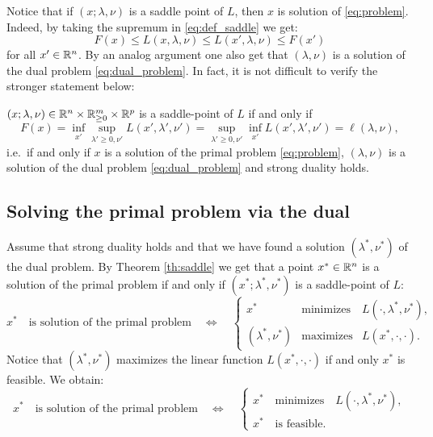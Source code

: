 \documentclass[11pt,nocut]{article}
\begin{document}
Notice that if $(x; \lambda,\nu)$ is a saddle point of $L$, then $x$ is solution of \eqref{eq:problem}. Indeed, by taking the supremum in \eqref{eq:def_saddle} we get:
$$
F(x) \leq L(x,\lambda,\nu) \leq L(x',\lambda,\nu) \leq F(x')
$$
for all $x' \in \mathbb{R}^n$. By an analog argument one also get that $(\lambda,\nu)$ is a solution of the dual problem \eqref{eq:dual_problem}.
In fact, it is not difficult to verify the stronger statement below:

\begin{theorem}\label{th:saddle}
	$(x; \lambda,\nu) \in \mathbb{R}^n \times \mathbb{R}_{\geq 0}^m \times \mathbb{R}^p$ is a saddle-point of $L$ if and only if
	\begin{equation}\label{eq:th_saddle}
	F(x)
	= 
	\inf_{x'}\sup_{\lambda' \geq 0, \nu'} L(x',\lambda',\nu')
	=
	\sup_{\lambda' \geq 0, \nu'}
	\inf_{x'}
	L(x',\lambda',\nu') 
	= \ell(\lambda,\nu),
	\end{equation}
	i.e.\ if and only if $x$ is a solution of the primal problem \eqref{eq:problem}, $(\lambda,\nu)$ is a solution of the dual problem \eqref{eq:dual_problem} and strong duality holds.
\end{theorem}

\subsection{Solving the primal problem via the dual}

Assume that strong duality holds and that we have found a solution $(\lambda^*,\nu^*)$ of the dual problem. 
By Theorem \ref{th:saddle} we get that a point $x^* \in \mathbb{R}^n$ is a solution of the primal problem if and only if $(x^*;\lambda^*,\nu^*)$ is a saddle-point of $L$:
$$
x^* \quad \text{is solution of the primal problem} \quad
\Longleftrightarrow
\quad
\left\{
	\!\!
\begin{array}{lll}
	x^* & \text{minimizes} & L(\cdot, \lambda^*,\nu^*), \\
	(\lambda^*,\nu^*) & \text{maximizes} & L(x^*, \cdot, \cdot).
\end{array}
\right.
$$
Notice that $(\lambda^*,\nu^*)$ maximizes the linear function $L(x^*, \cdot,\cdot)$ if and only $x^*$ is feasible. We obtain:
$$
x^* \quad \text{is solution of the primal problem} \quad
\Longleftrightarrow
\quad
\begin{cases}
	x^* \quad \text{minimizes} \quad L(\cdot, \lambda^*,\nu^*), \\
	x^* \quad \text{is feasible.}
\end{cases}
$$
\end{document}
